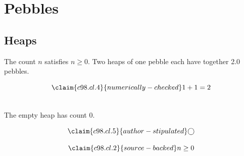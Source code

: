 \chapter{Pebbles}\label{c98}
\section{Heaps}\label{c98.s1}

\begin{theorem}[Count]\label{c98.thm.count}
  The count $n$ satisfies $n \geq 0$.
  Two heaps of one pebble each have together
  \num[c98.cl.4]{2.0}{} pebbles.
\end{theorem}

\begin{equation}\label{c98.eq.sum}\claim{c98.cl.4}{numerically-checked}
  1 + 1 = 2
\end{equation}

\begin{lemma}[Empty]\label{c98.lem.empty}\\%
  The empty heap has count $0$.
\end{lemma}

\begin{equation}\label{c98.eq.circle}\claim{c98.cl.5}{author-stipulated}
  \bigcirc
\end{equation}

\begin{vertiefung}[id=c98.v1, titel={T}, wozu={W}, voraussetzung={V}, zurueck={Z}]
  \begin{equation}\label{c98.eq.page}\claim{c98.cl.2}{source-backed}
    n \geq 0
  \end{equation}
\end{vertiefung}
